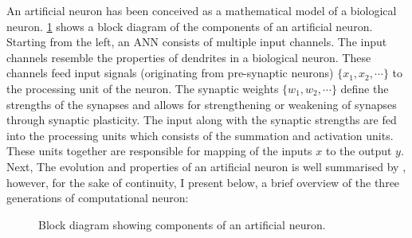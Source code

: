 An artificial neuron has been conceived as a mathematical model of a biological neuron. \figurename \ref{fig:art_neuron} shows a block diagram of the components of an artificial neuron. Starting from the left, an ANN consists of multiple input channels. The input channels resemble the properties of dendrites in a biological neuron. These channels feed input signals (originating from pre-synaptic neurons) $\{x_1,x_2,\cdots\}$ to the processing unit of the neuron. The synaptic weights $\{w_1, w_2,\cdots\}$ define the strengths of the synapses and allows for strengthening or weakening of synapses through synaptic plasticity. The input along with the synaptic strengths are fed into the processing units which consists of the summation and activation units. These units together are responsible for mapping of the inputs $x$ to the output $y$. Next, The evolution and properties of an artificial neuron is well summarised by \citet{ghosh2009spiking}, however, for the sake of continuity, I present below, a brief overview of the three generations of computational neuron:  
\begin{figure}
	\caption{Block diagram showing components of an artificial neuron.}
	\label{fig:art_neuron}
\end{figure}
